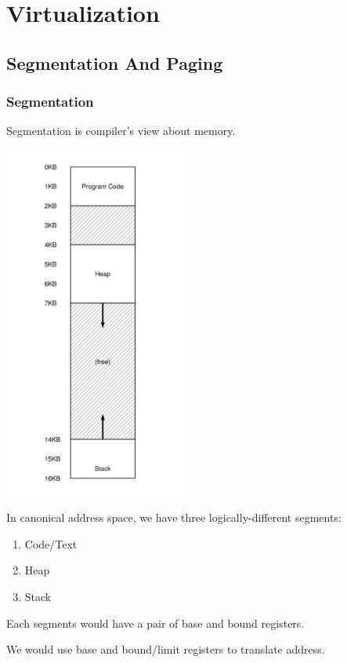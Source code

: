 \chapter{Virtualization}

\section{Segmentation And Paging}

\subsection{Segmentation}

    Segmentation is compiler's view about memory.

    \includegraphics[width=0.45\textwidth]{chapters/chapter1/Segmentation_Paging/Segmentation.png}

    In canonical address space, we have three logically-different segments:
    \begin{enumerate}
        \item Code/Text
        \item Heap
        \item Stack
    \end{enumerate}

    Each segments would have a pair of base and bound registers.

    We would use base and bound/limit registers to translate address. 
    
